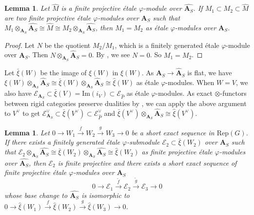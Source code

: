 \documentclass[10pt]{article}
\newtheorem{lem}[thm]{Lemma}
\numberwithin{equation}{section}
\newcommand{\calE}{{\mathcal E}}
\newcommand{\Ima}{{\mathrm{Im}}}            %
\newcommand{\Rep}{{\mathrm{Rep}}}           %
\newcommand{\bfA}{{\textbf{A}}}
\begin{document}
\begin{lem}\label{canonical-descent}
    Let $\widehat M$ is a finite projective \'etale $\varphi$-module over $\widehat {\bfA_S}$. If $M_1\subset M_2\subset \widehat M$ are two finite projective \'etale $\varphi$-modules over $\bfA_S$ such that $M_1\otimes_{\bfA_S}\widehat{\bfA_S}\cong \widehat M\cong M_2\otimes_{\bfA_S}\widehat{\bfA_S}$, then $M_1=M_2$ as \'etale $\varphi$-modules over $\bfA_S$.
\end{lem}
\begin{proof}
Let $N$ be the quotient $M_2/M_1$, which is a finitely generated \'etale $\varphi$-module over $\bfA_S$. Then $N\otimes_{\bfA_S}\widehat\bfA_S=0$. By \cite[Theorem 5.5.20]{EG21}, we see $N=0$. So $M_1=M_2$. 
\end{proof}



Let $\bar\xi(W)$ be the image of $\xi(W)$ in $\widehat\xi(W)$. As $\bfA_S\to \widehat \bfA_S$ is flat, we have $\xi(W)\otimes_{\bfA_S}\widehat\bfA_S\cong \bar \xi(W)\otimes_{\bfA_S}\widehat\bfA_S\cong \widehat \xi(W)$ as \'etale $\varphi$-modules. When $W=V$, we also have $\calE_{\bfA_S}\subset \bar\xi(V)=\Ima(i_V)\subset\calE_{\widehat P}$ as \'etale $\varphi$-modules. As exact  $\otimes$-functors between rigid categories preserve dualities by \cite[Proposition 1.9]{deligne1982tannakian}, we can apply the above argument to $V^{\vee}$ to get $\calE^{\vee}_{\bfA_S}\subset \bar\xi(V^{\vee})\subset\calE_{\widehat P}^\vee$ and $\bar \xi(V^{\vee})\otimes_{\bfA_S}\widehat\bfA_S\cong \widehat \xi(V^{\vee})$.




\begin{lem}\label{1-out-of-3}
   Let $0\to W_1\xrightarrow{f} W_2\xrightarrow{g}W_3\to 0$ be a short exact sequence in $\Rep(G)$. If there exists a finitely generated \'etale $\varphi$-submodule $\calE_2\subset \bar\xi(W_2)$ over $\bfA_S$ such that $\calE_2\otimes_{\bfA_S}\widehat{\bfA_S}\cong \bar\xi(W_2)\otimes_{\bfA_S}\widehat{\bfA_S}\cong \widehat\xi(W_2)$ as finite projective \'etale $\varphi$-modules over $\widehat{\bfA_S}$, then $\calE_2$ is finite projective and there exists a short exact sequence of finite projective \'etale $\varphi$-modules over $\bfA_S$ 
   \[
   0\to \calE_1\xrightarrow{\tilde f}\calE_2\xrightarrow{\tilde g}\calE_3\to 0
   \]
   whose base change to $\widehat{\bfA_S}$ is isomorphic to $0\to \widehat\xi(W_1)\xrightarrow{f} \widehat\xi(W_2)\xrightarrow{g}\widehat\xi(W_3)\to 0$.
  
\end{lem}
\end{document}
